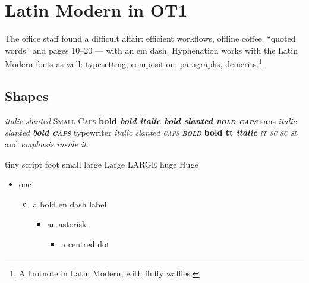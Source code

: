 \documentclass{article}
\begin{document}
\section{Latin Modern in OT1}
The office staff found a difficult affair: efficient workflows, offline coffee, ``quoted words'' and pages 10--20 --- with an em dash. Hyphenation works with the Latin Modern fonts as well: typesetting, composition, paragraphs, demerits.\footnote{A footnote in Latin Modern, with fluffy waffles.}

\subsection{Shapes}
{\itshape italic} {\slshape slanted} {\scshape Small Caps} {\bfseries bold \itshape bold italic \slshape bold slanted \scshape bold caps}
{\sffamily sans \itshape italic \slshape slanted \bfseries bold \scshape caps} {\ttfamily typewriter \itshape italic \slshape slanted \scshape caps \bfseries bold} {\ttfamily\bfseries bold tt \itshape italic}
{\itshape\scshape it sc} {\scshape\slshape sc sl} and \emph{emphasis \emph{inside} it}.

{\tiny tiny} {\scriptsize script} {\footnotesize foot} {\small small} {\large large} {\Large Large} {\LARGE LARGE} {\huge huge} {\Huge Huge}

\begin{itemize}
\item one
  \begin{itemize}
  \item a bold en dash label
    \begin{itemize}
    \item an asterisk
      \begin{itemize}
      \item a centred dot
      \end{itemize}
    \end{itemize}
  \end{itemize}
\end{itemize}
\end{document}
